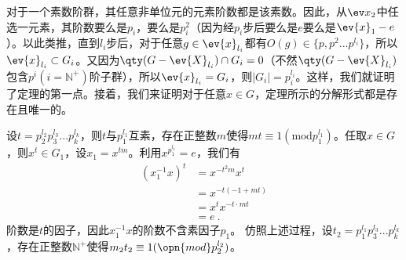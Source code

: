 对于一个素数阶群，其任意非单位元的元素阶数都是该素数。因此，从$\ev x_2$中任选一元素，其阶数要么是$p_i$，要么是$p_i^2$（因为经$p_i$步后要么是$e$要么是$\ev{x}_1-e$）。以此类推，直到$l_i$步后，对于任意$g\in\ev{x}_{l_i}$都有$O(g)\in\{p,p^2...p^{l_i}\}$，所以$\ev{x}_{l_i}\subset G_i$。又因为$\qty (G-\ev{X}_{l_i})\cap G_i=0$（不然$\qty (G-\ev{X}_{l_i})$包含$p^i(i=\mathbb N^{+})$阶子群），所以$\ev{x}_{l_i}=G_i$，则$|G_i|=p_i^{l_i}$。这样，我们就证明了定理的第一点。接着，我们来证明对于任意$x\in G$，定理所示的分解形式都是存在且唯一的。

设$t=p_2^{l_2}p_3^{l_3}...p_k^{l_k}$，则$t$与$p_1^{l_1}$互素，存在正整数$m$使得$mt\equiv 1(\mathrm {mod} p_1^{l_1})$。任取$x\in G$，则$x^t\in G_1$，设$x_1=x^{tm}$。利用$x^{p_1^{l_1}}=e$，我们有
\begin{equation}
\begin{aligned}
(x_1^{-1}x)^t&=x^{-t^2m}x^t\\
&=x^{-t(-1+mt)}\\
&=x^tx^{-t\cdot mt}\\
&=e~.
\end{aligned}
\end{equation}
阶数是$t$的因子，因此$x_1^{-1}x$的阶数不含素因子$p_1$。
仿照上述过程，设$t_2=p_1^{l_1}p_3^{l_3}...p_k^{l_k}$，存在正整数$\mathbb N^{+}$使得$m_2t_2\equiv 1(\opn{mod}p_2^{l_2})$。


